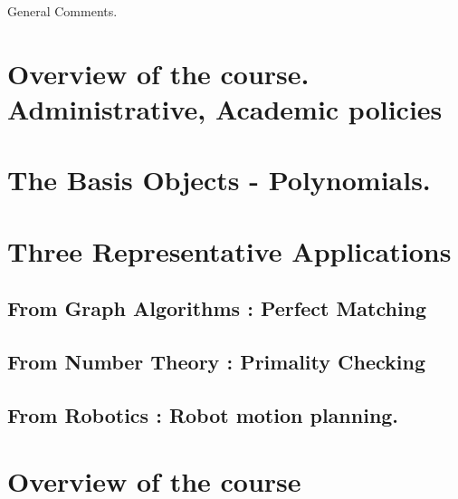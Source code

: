 
\noindent
General Comments.

\section{Overview of the course. Administrative, Academic policies}
\newpage
\section{The Basis Objects - Polynomials.}
\newpage
\section{Three Representative Applications}
\subsection{From Graph Algorithms : Perfect Matching}
\newpage \newpage \newpage
\subsection{From Number Theory : Primality Checking}
\newpage \newpage \newpage
\subsection{From Robotics : Robot motion planning.}
\newpage \newpage \newpage
\section{Overview of the course}
\newpage \newpage


